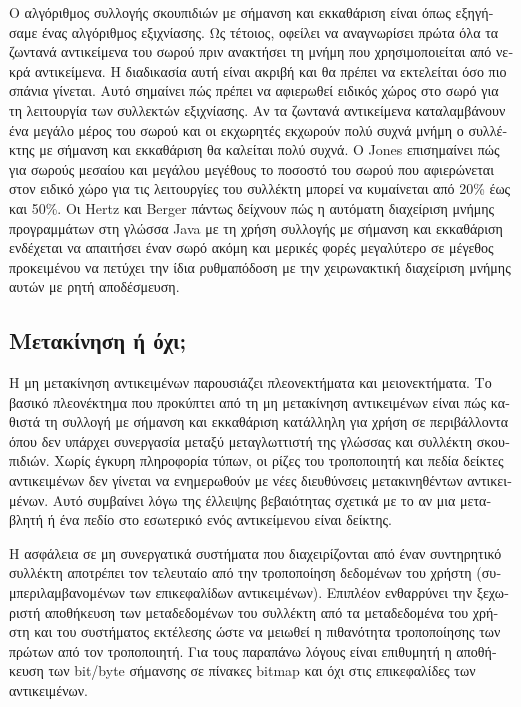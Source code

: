 \begin{greek}
Ο αλγόριθμος συλλογής σκουπιδιών με σήμανση και εκκαθάριση είναι
όπως εξηγήσαμε ένας αλγόριθμος εξιχνίασης. Ως τέτοιος, οφείλει 
να αναγνωρίσει πρώτα όλα τα ζωντανά αντικείμενα του σωρού πριν
ανακτήσει τη μνήμη που χρησιμοποιείται από νεκρά αντικείμενα. 
Η διαδικασία αυτή είναι ακριβή και θα πρέπει να εκτελείται όσο 
πιο σπάνια γίνεται. Αυτό σημαίνει πώς πρέπει να αφιερωθεί ειδικός 
χώρος στο σωρό για τη λειτουργία των συλλεκτών εξιχνίασης. Αν 
τα ζωντανά αντικείμενα καταλαμβάνουν ένα μεγάλο μέρος του σωρού 
και οι εκχωρητές εκχωρούν πολύ συχνά μνήμη ο συλλέκτης με σήμανση 
και εκκαθάριση θα καλείται πολύ συχνά. O Jones \cite{DBLP:books/wi/JonesL96} επισημαίνει 
πώς για σωρούς μεσαίου και μεγάλου μεγέθους το ποσοστό του σωρού 
που αφιερώνεται στον ειδικό χώρο για τις λειτουργίες του συλλέκτη 
μπορεί να κυμαίνεται από 20\% έως και 50\%. Οι Hertz και Berger
\cite{DBLP:conf/oopsla/HertzB05} πάντως δείχνουν πώς
η αυτόματη διαχείριση μνήμης προγραμμάτων στη γλώσσα Java με
τη χρήση συλλογής με σήμανση και εκκαθάριση ενδέχεται να απαιτήσει
έναν σωρό ακόμη και μερικές φορές μεγαλύτερο σε μέγεθος προκειμένου
να πετύχει την ίδια ρυθμαπόδοση με την χειρωνακτική διαχείριση
μνήμης αυτών με ρητή αποδέσμευση.

\subsection{Μετακίνηση ή όχι;}
Η μη μετακίνηση αντικειμένων παρουσιάζει πλεονεκτήματα και
μειονεκτήματα. Το βασικό πλεονέκτημα που προκύπτει από τη μη
μετακίνηση αντικειμένων είναι πώς καθιστά τη συλλογή με σήμανση
και εκκαθάριση κατάλληλη για χρήση σε περιβάλλοντα όπου δεν 
υπάρχει συνεργασία μεταξύ μεταγλωττιστή της γλώσσας και συλλέκτη
σκουπιδιών. Χωρίς έγκυρη πληροφορία τύπων, οι ρίζες του τροποποιητή
και πεδία δείκτες αντικειμένων δεν γίνεται να ενημερωθούν με 
νέες διευθύνσεις μετακινηθέντων αντικειμένων. Αυτό συμβαίνει 
λόγω της έλλειψης βεβαιότητας σχετικά με το αν μια μεταβλητή 
ή ένα πεδίο στο εσωτερικό ενός αντικείμενου είναι δείκτης. 

Η ασφάλεια σε μη συνεργατικά συστήματα που διαχειρίζονται από
έναν συντηρητικό συλλέκτη αποτρέπει τον τελευταίο από την
τροποποίηση δεδομένων του χρήστη (συμπεριλαμβανομένων των
επικεφαλίδων αντικειμένων). Επιπλέον ενθαρρύνει την ξεχωριστή
αποθήκευση των μεταδεδομένων του συλλέκτη από τα μεταδεδομένα
του χρήστη και του συστήματος εκτέλεσης ώστε να μειωθεί η
πιθανότητα τροποποίησης των πρώτων από τον τροποποιητή. Για 
τους παραπάνω λόγους είναι επιθυμητή η αποθήκευση των bit/byte
σήμανσης σε πίνακες bitmap και όχι στις επικεφαλίδες των
αντικειμένων.


\end{greek}
